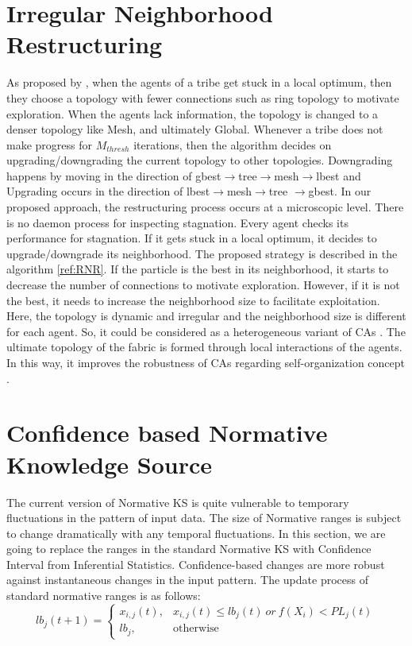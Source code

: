 \section{Irregular Neighborhood Restructuring}
As proposed by \cite{ali2016leveraged}, when the agents of a tribe get stuck in a local optimum, then they choose a topology with fewer connections such as ring topology to motivate exploration. When the agents lack information, the topology is changed to a denser topology like Mesh, and ultimately Global. Whenever a tribe does not make progress for $M_{thresh}$ iterations, then the algorithm decides on upgrading/downgrading the current topology to other topologies. Downgrading happens by moving in the direction of gbest$\rightarrow$tree$\rightarrow$mesh$\rightarrow$lbest and Upgrading occurs in the direction of lbest$\rightarrow$mesh$\rightarrow$tree $\rightarrow$gbest. In our proposed approach, the restructuring process occurs at a microscopic level. There is no daemon process for inspecting stagnation. Every agent checks its performance for stagnation. If it gets stuck in a local optimum, it decides to upgrade/downgrade its neighborhood. The proposed strategy is described in the algorithm \ref{ref:RNR}. If the particle is the best in its neighborhood, it starts to decrease the number of connections to motivate exploration. However, if it is not the best, it needs to increase the neighborhood size to facilitate exploitation. Here, the topology is dynamic and irregular and the neighborhood size is different for each agent. So, it could be considered as a heterogeneous variant of CAs \cite{de2009heterogeneous}. The ultimate topology of the fabric is formed through local interactions of the agents. In this way, it improves the robustness of CAs regarding self-organization concept \cite{kennedy2001swarm}.

\section{Confidence based Normative Knowledge Source}
The current version of Normative KS is quite vulnerable to temporary fluctuations in the pattern of input data. The size of Normative ranges is subject to change dramatically with any temporal fluctuations. In this section, we are going to replace the ranges in the standard Normative KS with Confidence Interval from Inferential Statistics. Confidence-based changes are more robust against instantaneous changes in the input pattern. The update process of standard normative ranges is as follows:
\begin{equation}
lb_{j}(t+1) = \begin{cases} x_{i,j}(t), & x_{i,j}(t)\leq lb_{j}(t)\:or\:f(X_{i})<PL_{j}(t)  \\ lb_{j}, & \mbox{otherwise} \end{cases}
\end{equation}

